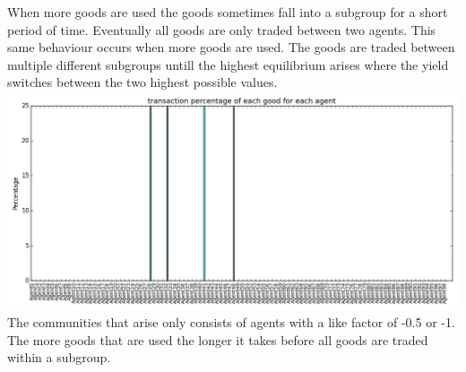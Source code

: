 \documentclass[twoside,openright]{uva-bachelor-thesis}
\begin{document}
When more goods are used the goods sometimes fall into a subgroup for a short period of time. Eventually all goods are only traded between two agents. This same behaviour occurs when more goods are used. The goods are traded between multiple different subgroups untill the highest equilibrium arises where the yield switches between the two highest possible values. \\
\includegraphics[scale=0.4]{GR_L1B2N1/10k_2goods_2subgroups}
The communities that arise only consists of agents with a like factor of -0.5 or -1. The more goods that are used the longer it takes before all goods are traded within a subgroup.
\end{document}
